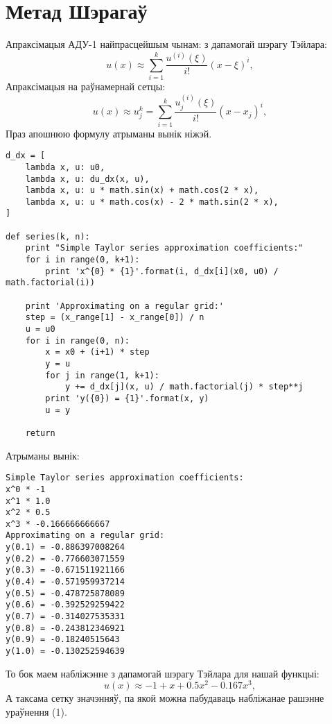 \section{Метад Шэрагаў}

Апраксімацыя АДУ-1 найпрасцейшым чынам: з дапамогай шэрагу Тэйлара:\\
$$ u(x) \approx \sum_{i=1}^{k} \frac{u^{(i)}(\xi)}{i!}(x-\xi)^{i}, $$
Апраксімацыя на раўнамернай сетцы:
$$ u(x) \approx u_j^k = \sum_{i=1}^{k} \frac{u_j^{(i)}(\xi)}{i!}(x-x_j)^{i}, $$
Праз апошнюю формулу атрыманы вынік ніжэй.

\begin{verbatim}
d_dx = [
    lambda x, u: u0,
    lambda x, u: du_dx(x, u),
    lambda x, u: u * math.sin(x) + math.cos(2 * x),
    lambda x, u: u * math.cos(x) - 2 * math.sin(2 * x),
]

def series(k, n):
    print "Simple Taylor series approximation coefficients:"
    for i in range(0, k+1):
        print 'x^{0} * {1}'.format(i, d_dx[i](x0, u0) / math.factorial(i))

    print 'Approximating on a regular grid:'
    step = (x_range[1] - x_range[0]) / n
    u = u0
    for i in range(0, n):
        x = x0 + (i+1) * step
        y = u
        for j in range(1, k+1):
            y += d_dx[j](x, u) / math.factorial(j) * step**j
        print 'y({0}) = {1}'.format(x, y)
        u = y

    return
\end{verbatim}

Атрыманы вынік:

\begin{verbatim}
Simple Taylor series approximation coefficients:
x^0 * -1
x^1 * 1.0
x^2 * 0.5
x^3 * -0.166666666667
Approximating on a regular grid:
y(0.1) = -0.886397008264
y(0.2) = -0.776603071559
y(0.3) = -0.671511921166
y(0.4) = -0.571959937214
y(0.5) = -0.478725878089
y(0.6) = -0.392529259422
y(0.7) = -0.314027535331
y(0.8) = -0.243812346921
y(0.9) = -0.18240515643
y(1.0) = -0.130252594639
\end{verbatim}

То бок маем набліжэнне з дапамогай шэрагу Тэйлара для нашай функцыі:
$$ u(x) \approx -1 + x + 0.5x^2 - 0.167x^3,$$
А таксама сетку значэнняў, па якой можна пабудаваць набліжанае рашэнне ураўнення (1).